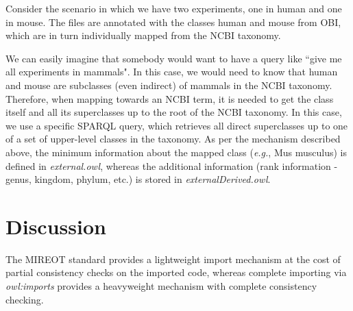 \documentclass{elsart3p}    %
\begin{document}
Consider the scenario in which we have two experiments, one in human and one in mouse. The files are annotated with the classes human and mouse from OBI, which are in turn individually mapped from the NCBI taxonomy.

We can easily imagine that somebody would want to have a query like ``give me all experiments in mammals". In this case, we would need to know that human and mouse are subclasses (even indirect) of mammals in the NCBI taxonomy.
Therefore, when mapping towards an NCBI term, it is needed to get the class itself and all its superclasses up to the root of the NCBI taxonomy.
In this case, we use a specific SPARQL query, which retrieves all direct superclasses up to one of a set of upper-level classes in the taxonomy.%
As per the mechanism described above, the minimum information about the mapped class (\emph{e.g.}, Mus musculus) is defined in \emph{external.owl}, whereas the additional information (rank information - genus, kingdom, phylum, etc.) is stored in \emph{ externalDerived.owl}. 



\section*{Discussion}

The MIREOT standard provides a lightweight import mechanism at the cost of partial consistency checks on the imported code, whereas complete importing via \textit{owl:imports} provides a heavyweight mechanism with complete consistency checking.
\end{document}
